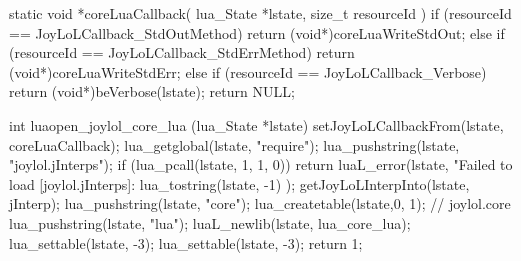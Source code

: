 static void *coreLuaCallback(
  lua_State *lstate,
  size_t resourceId
) {
  if (resourceId == JoyLoLCallback_StdOutMethod) {
    return (void*)coreLuaWriteStdOut;
  } else if (resourceId == JoyLoLCallback_StdErrMethod) {
    return (void*)coreLuaWriteStdErr;
  } else if (resourceId == JoyLoLCallback_Verbose) {
    return (void*)beVerbose(lstate);
  }
  return NULL;
} 

int luaopen_joylol_core_lua (lua_State *lstate) {
  setJoyLoLCallbackFrom(lstate, coreLuaCallback);
  lua_getglobal(lstate, "require");
  lua_pushstring(lstate, "joylol.jInterps");
  if (lua_pcall(lstate, 1, 1, 0)) {
    return luaL_error(lstate,
      "Failed to load [joylol.jInterps]\nERROR:\n%
      lua_tostring(lstate, -1)
    );
  }
  getJoyLoLInterpInto(lstate, jInterp);
  lua_pushstring(lstate, "core");
  lua_createtable(lstate,0, 1); // joylol.core 
  lua_pushstring(lstate, "lua");
  luaL_newlib(lstate, lua_core_lua);
  lua_settable(lstate, -3);
  lua_settable(lstate, -3);
  return 1;
}
\stopCCode